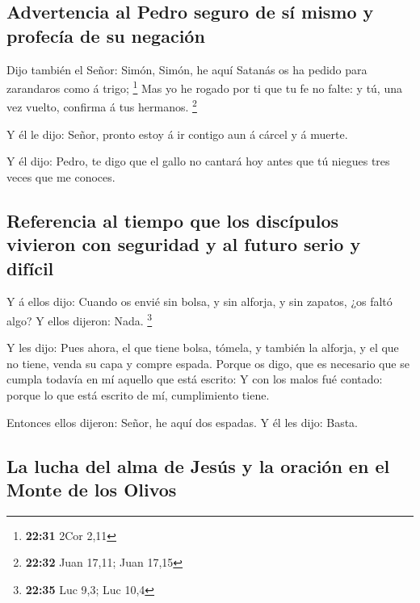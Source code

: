 \hypertarget{advertencia-al-pedro-seguro-de-suxed-mismo-y-profecuxeda-de-su-negaciuxf3n}{%
\subsection{Advertencia al Pedro seguro de sí mismo y profecía de su
negación}\label{advertencia-al-pedro-seguro-de-suxed-mismo-y-profecuxeda-de-su-negaciuxf3n}}

 Dijo también el Señor: Simón, Simón, he aquí Satanás os
ha pedido para zarandaros como á trigo; \footnote{\textbf{22:31} 2Cor
  2,11}  Mas yo he rogado por ti que tu fe no falte: y
tú, una vez vuelto, confirma á tus hermanos. \footnote{\textbf{22:32}
  Juan 17,11; Juan 17,15}

 Y él le dijo: Señor, pronto estoy á ir contigo aun á
cárcel y á muerte.

 Y él dijo: Pedro, te digo que el gallo no cantará hoy
antes que tú niegues tres veces que me conoces.

\hypertarget{referencia-al-tiempo-que-los-discuxedpulos-vivieron-con-seguridad-y-al-futuro-serio-y-difuxedcil}{%
\subsection{Referencia al tiempo que los discípulos vivieron con
seguridad y al futuro serio y
difícil}\label{referencia-al-tiempo-que-los-discuxedpulos-vivieron-con-seguridad-y-al-futuro-serio-y-difuxedcil}}

 Y á ellos dijo: Cuando os envié sin bolsa, y sin
alforja, y sin zapatos, ¿os faltó algo? Y ellos dijeron: Nada.
\footnote{\textbf{22:35} Luc 9,3; Luc 10,4}

 Y les dijo: Pues ahora, el que tiene bolsa, tómela, y
también la alforja, y el que no tiene, venda su capa y compre espada.
 Porque os digo, que es necesario que se cumpla todavía
en mí aquello que está escrito: Y con los malos fué contado: porque lo
que está escrito de mí, cumplimiento tiene.

 Entonces ellos dijeron: Señor, he aquí dos espadas. Y él
les dijo: Basta.

\hypertarget{la-lucha-del-alma-de-jesuxfas-y-la-oraciuxf3n-en-el-monte-de-los-olivos}{%
\subsection{La lucha del alma de Jesús y la oración en el Monte de los
Olivos}\label{la-lucha-del-alma-de-jesuxfas-y-la-oraciuxf3n-en-el-monte-de-los-olivos}}

